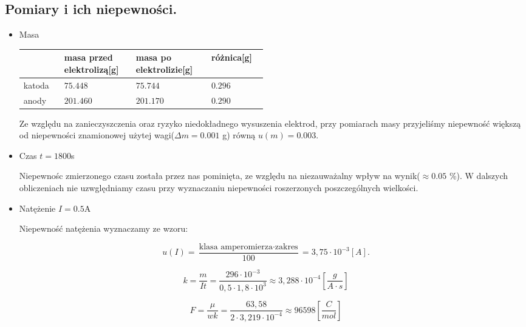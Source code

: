 \documentclass [a4paper,11pt]{article}
\begin{document}
	\subsection{Pomiary i ich niepewności.}
	\begin{itemize}
		\item Masa
			\begin{center}
			\begin{tabular}{p{0.1\linewidth}|p{0.13\linewidth}|p{0.15\linewidth}|p{0.1\linewidth}}
				&masa przed elektrolizą[g]&masa po elektrolizie[g]& różnica[g]\\
				\hline
				katoda&$75.448$&$75.744$&$0.296$ \\
				\hline
				anody &$201.460$&$201.170$&$0.290$ \\
			\end{tabular} 	
		\end{center}
		Ze względu na zanieczyszczenia oraz ryzyko niedokładnego wysuszenia elektrod, przy pomiarach masy przyjeliśmy niepewność większą od niepewności znamionowej użytej wagi($\Delta m=0.001$ g) równą $u(m)=0.003$. 
		
		\item Czas $ t=1800$s
		
		Niepewnośc zmierzonego czasu została przez nas pominięta, ze względu na niezauważalny wpływ na wynik($\approx0.05$ \%). W dalszych obliczeniach nie uzwględniamy czasu 
		przy wyznaczaniu niepewności roszerzonych poszczególnych wielkości.
		
		\item Natężenie $I=0.5$A
		
		Niepewność natężenia wyznaczamy ze wzoru:
	\end{itemize}
	\begin{equation}
	\label{eq:amper}
	u(I) = \frac{\text{klasa amperomierza} \cdot \text{zakres}}{100} = 3,75 \cdot 10^{-3} [A].
	\end{equation}

 	\begin{equation}
 	k = \frac{m}{I t} = \frac{296 \cdot 10^{-3}}{0,5 \cdot 1,8 \cdot 10^3} \approx 3,288\cdot 10^{-4} \left[  \frac{g}{A \cdot s}\right] 
 	\label{k_obliczone} 
 	\end{equation}
 	

 	\begin{equation}
 	F = \frac{\mu}{w k} = \frac{63,58 }{2 \cdot 3,219 \cdot 10^{-4}} \approx 96598  \left[  \frac{C}{mol}\right] 
 	\label{F_obliczone} 
 	\end{equation}
 	
\end{document}
